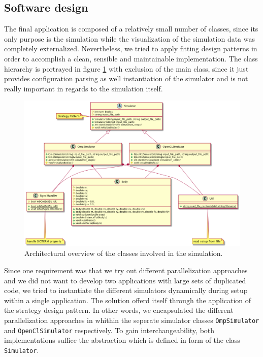 \documentclass[a4paper,11pt]{scrartcl} %
\begin{document}
\subsection{Software design}
\label{software_design}
The final application is composed of a relatively small number of classes, since its only purpose is the simulation while the visualization of the simulation data was completely externalized. Nevertheless, we tried to apply fitting design patterns in order to accomplish a clean, sensible and maintainable implementation. The class hierarchy is portrayed in figure \ref{fig:classes} with exclusion of the main class, since it just provides configuration parsing as well instantiation of the simulator and is not really important in regards to the simulation itself.
\begin{figure}[h!]
	\centering
	\includegraphics[width=\textwidth]{img/classes.png}
	\caption{Architectural overview of the classes involved in the simulation.}
	\label{fig:classes}
\end{figure}
Since one requirement was that we try out different parallelization approaches and we did not want to develop two applications with large sets of duplicated code, we tried to instantiate the different simulators dynamically during setup within a single application. The solution offerd itself through the application of the strategy design pattern. In other words, we encapsulated the different parallelization approaches in whithin the seperate simulator classes \texttt{OmpSimulator} and \texttt{OpenClSimulator} respectively. To gain interchangeability, both implementations suffice the abstraction which is defined in form of the class \texttt{Simulator}.\\\\
\end{document}
